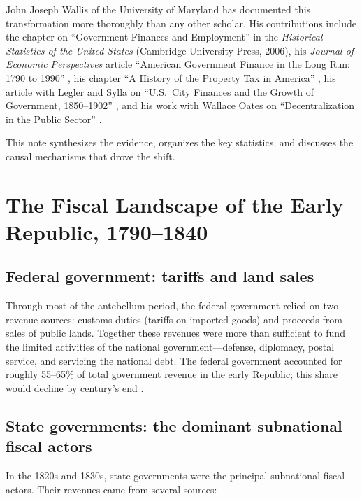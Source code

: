 \documentclass[12pt]{article}
\begin{document}
John Joseph Wallis of the University of Maryland has documented this transformation more thoroughly than any other scholar.  His contributions include the chapter on ``Government Finances and Employment'' in the \textit{Historical Statistics of the United States} (Cambridge University Press, 2006), his \textit{Journal of Economic Perspectives} article ``American Government Finance in the Long Run: 1790 to 1990'' \citep{wallis2000jep}, his chapter ``A History of the Property Tax in America'' \citep{wallis2001property}, his article with Legler and Sylla on ``U.S.\ City Finances and the Growth of Government, 1850--1902'' \citep{legler_sylla_wallis1988}, and his work with Wallace Oates on ``Decentralization in the Public Sector'' \citep{wallis_oates1988}.

This note synthesizes the evidence, organizes the key statistics, and discusses the causal mechanisms that drove the shift.


\section{The Fiscal Landscape of the Early Republic, 1790--1840}

\subsection{Federal government: tariffs and land sales}

Through most of the antebellum period, the federal government relied on two revenue sources: customs duties (tariffs on imported goods) and proceeds from sales of public lands.  Together these revenues were more than sufficient to fund the limited activities of the national government---defense, diplomacy, postal service, and servicing the national debt.  The federal government accounted for roughly 55--65\% of total government revenue in the early Republic; this share would decline by century's end \citep{wallis2000jep}.

\subsection{State governments: the dominant subnational fiscal actors}

In the 1820s and 1830s, state governments were the principal subnational fiscal actors.  Their revenues came from several sources:
\end{document}

